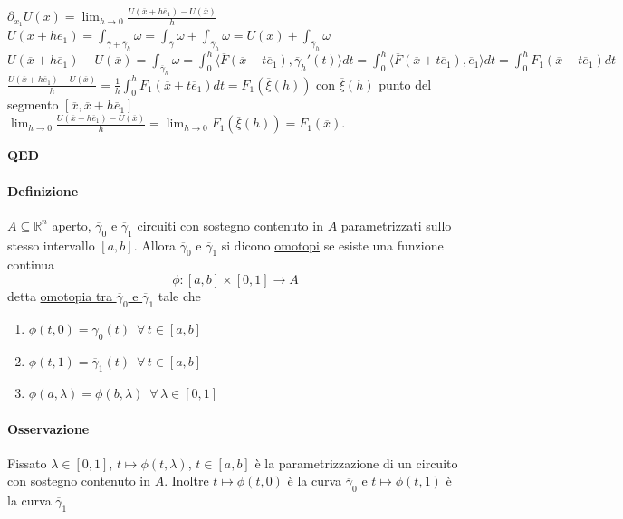 \documentclass{article}
\newcommand{\R}{\mathbb{R}}
\begin{document}
$\partial_{x_1}U(\overline{x})= \lim_{h\rightarrow 0}\frac{U(\overline{x}+h\overline{e}_1)-U(\overline{x})}{h}$\\
$U(\overline{x} + h \overline{e}_1 )=\int_{\overline{\gamma}+\overline{\gamma}_h}\omega=\int_{\overline{\gamma}}\omega+\int_{\overline{\gamma}_h}\omega= U(\overline{x})+\int_{\overline{\gamma}_h}\omega$\\
$U(\overline{x}+h \overline{e}_1)-U(\overline{x})=\int_{\overline{\gamma}_h}\omega=\int_0^h\langle \overline{F}(\overline{x}+t\overline{e}_1),\overline{\gamma}_h'(t)\rangle dt = \int_0^h \langle \overline{F}(\overline{x}+t\overline{e}_1),\overline{e}_1 \rangle dt = \int_0^h F_1(\overline{x}+t\overline{e}_1)dt$\\
$\frac{U(\overline{x}+h\overline{e}_1)-U(\overline{x})}{h}=\frac{1}{h}\int_0^h F_1(\overline{x}+t\overline{e}_1)dt=F_1(\overline{\xi}(h))$ con $\overline{\xi}(h)$ punto del segmento $[\overline{x},\overline{x}+h\overline{e}_1]$\\
$\lim_{h\rightarrow 0} \frac{U(\overline{x}+h\overline{e}_1)-U(\overline{x})}{h}=\lim_{h\rightarrow 0} F_1 (\overline{\xi}(h))=F_1(\overline{x})$.
\begin{flushright}
   \textbf{QED}
\end{flushright}

\paragraph{{Definizione}}
$A \subseteq \R^n$ aperto, $\overline{\gamma}_0$ e $\overline{\gamma}_1$ circuiti con sostegno contenuto in $A$ parametrizzati sullo stesso intervallo $[a,b]$. Allora $\overline{\gamma}_0$ e $\overline{\gamma}_1$ si dicono \underline{omotopi} se esiste una funzione continua 
\begin{equation*}
    \phi: [a,b]\times [0,1]\rightarrow A
\end{equation*}
detta \underline{omotopia tra $\overline{\gamma}_0$ e $\overline{\gamma}_1$} tale che
\begin{enumerate}
    \item $\phi(t,0)=\overline{\gamma}_0(t)\,\,\, \forall\, t \in [a,b]$
    \item $\phi(t,1)=\overline{\gamma}_1(t)\,\,\, \forall\, t \in [a,b]$
    \item $\phi(a,\lambda)=\phi(b,\lambda)\,\,\, \forall \, \lambda \in[0,1]$
\end{enumerate}

\paragraph{{Osservazione}}
Fissato $\lambda \in[0,1]$, $t \mapsto \phi(t,\lambda)$, $t \in [a,b]$ è la parametrizzazione di un circuito con sostegno contenuto  in $A$. Inoltre  $t \mapsto \phi(t,0)$ è la curva $\overline{\gamma}_0$ e $t \mapsto \phi(t,1)$ è la curva $\overline{\gamma}_1$
\end{document}
